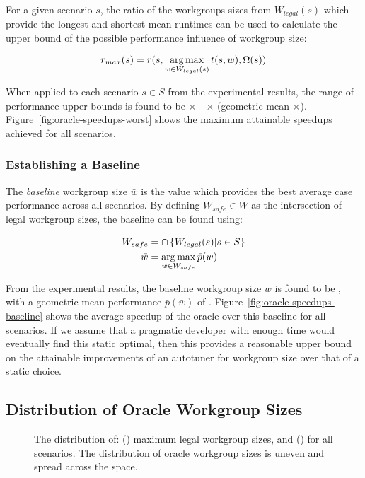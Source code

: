 For a given scenario $s$, the ratio of the workgroups sizes from
$W_{legal}(s)$ which provide the longest and shortest mean runtimes
can be used to calculate the upper bound of the possible performance
influence of workgroup size:

\begin{equation}
r_{max}(s) = r(s, \operatorname*{arg\,max}_{w \in W_{legal}(s)} t(s,w), \Omega(s))
\end{equation}

When applied to each scenario $s \in S$ from the experimental results,
the range of performance upper bounds is found to be
$\times$ -
$\times$ (geometric mean
$\times$). Figure~\ref{fig:oracle-speedups-worst}
shows the maximum attainable speedups achieved for all scenarios.


\subsubsection{Establishing a Baseline}

The \emph{baseline} workgroup size $\bar{w}$ is the value which
provides the best average case performance across all scenarios.  By
defining $W_{safe} \in W$ as the intersection of legal workgroup
sizes, the baseline can be found using:

\begin{align}
W_{safe} &= \cap \left\{ W_{legal}(s) | s \in S \right\}\\
\bar{w} &= \operatorname*{arg\,max}_{w \in W_{safe}} \bar{p}(w)
\end{align}

From the experimental results, the baseline workgroup size $\bar{w}$
is found to be , with a geometric mean performance
$\bar{p}(\bar{w})$ of
. Figure~\ref{fig:oracle-speedups-baseline}
shows the average speedup of the oracle over this baseline for all
scenarios. If we assume that a pragmatic developer with enough time
would eventually find this static optimal, then this provides a
reasonable upper bound on the attainable improvements of an autotuner
for workgroup size over that of a static choice.


\subsection{Distribution of Oracle Workgroup Sizes}

\begin{figure}

\caption{%
  The distribution of: () maximum legal
  workgroup sizes, and () for all
  scenarios. The distribution of oracle workgroup sizes is uneven and
  spread across the space.%
}
\label{fig:heatmaps}
\end{figure}

